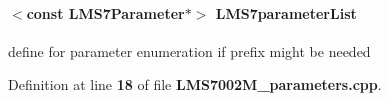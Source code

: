 \paragraph[{L\+M\+S7parameter\+List}]{$<$const {\bf L\+M\+S7\+Parameter}$\ast$$>$ L\+M\+S7parameter\+List}\label{LMS7002M__parameters_8cpp_ab91c6577cf64919b80427f6e7e0cee04}


define for parameter enumeration if prefix might be needed 



Definition at line {\bf 18} of file {\bf L\+M\+S7002\+M\+\_\+parameters.\+cpp}.

